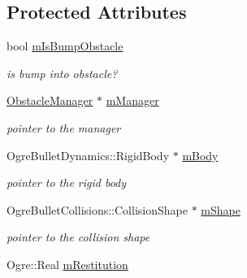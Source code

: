 \subsection*{Protected Attributes}
\begin{DoxyCompactItemize}
\item 
bool \hyperlink{class_n_c_t_u_1_1_obstacle_a4305d4e1560537dc2d83de619976deb3}{m\+Is\+Bump\+Obstacle}\hypertarget{class_n_c_t_u_1_1_obstacle_a4305d4e1560537dc2d83de619976deb3}{}\label{class_n_c_t_u_1_1_obstacle_a4305d4e1560537dc2d83de619976deb3}

\begin{DoxyCompactList}\small\item\em is bump into obstacle? \end{DoxyCompactList}\item 
\hyperlink{class_n_c_t_u_1_1_obstacle_manager}{Obstacle\+Manager} $\ast$ \hyperlink{class_n_c_t_u_1_1_obstacle_ac6f0b6d7230560172417c3bfe1b78582}{m\+Manager}\hypertarget{class_n_c_t_u_1_1_obstacle_ac6f0b6d7230560172417c3bfe1b78582}{}\label{class_n_c_t_u_1_1_obstacle_ac6f0b6d7230560172417c3bfe1b78582}

\begin{DoxyCompactList}\small\item\em pointer to the manager \end{DoxyCompactList}\item 
Ogre\+Bullet\+Dynamics\+::\+Rigid\+Body $\ast$ \hyperlink{class_n_c_t_u_1_1_obstacle_afaa1b0da65edd91625b3eef7d374f4b6}{m\+Body}\hypertarget{class_n_c_t_u_1_1_obstacle_afaa1b0da65edd91625b3eef7d374f4b6}{}\label{class_n_c_t_u_1_1_obstacle_afaa1b0da65edd91625b3eef7d374f4b6}

\begin{DoxyCompactList}\small\item\em pointer to the rigid body \end{DoxyCompactList}\item 
Ogre\+Bullet\+Collisions\+::\+Collision\+Shape $\ast$ \hyperlink{class_n_c_t_u_1_1_obstacle_a4f7c737bb2030cad087cd9c287598d17}{m\+Shape}\hypertarget{class_n_c_t_u_1_1_obstacle_a4f7c737bb2030cad087cd9c287598d17}{}\label{class_n_c_t_u_1_1_obstacle_a4f7c737bb2030cad087cd9c287598d17}

\begin{DoxyCompactList}\small\item\em pointer to the collision shape \end{DoxyCompactList}\item 
Ogre\+::\+Real \hyperlink{class_n_c_t_u_1_1_obstacle_a41e92d725f5cfe94dcd2d45873368d9a}{m\+Restitution}\hypertarget{class_n_c_t_u_1_1_obstacle_a41e92d725f5cfe94dcd2d45873368d9a}{}\label{class_n_c_t_u_1_1_obstacle_a41e92d725f5cfe94dcd2d45873368d9a}


\end{DoxyCompactItemize}
